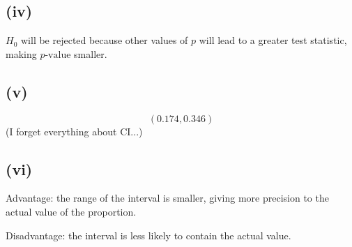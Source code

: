 \documentclass[a4paper]{article}
\newcommand{\pp}{p\text{-value}}
\begin{document}
\subsection*{(iv)}
\(H_0\) will be rejected because other values of \(p\) will lead to a greater test statistic, making \(\pp\) smaller.

\subsection*{(v)}
\[(0.174,0.346)\]
(I forget everything about CI...)

\subsection*{(vi)}
Advantage: the range of the interval is smaller, giving more precision to the actual value of the proportion.

Disadvantage: the interval is less likely to contain the actual value.
\end{document}
